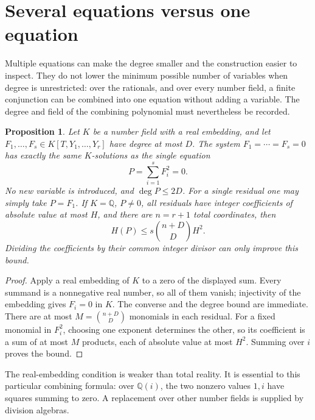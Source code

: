 \documentclass[11pt]{article}
\newtheorem{proposition}[theorem]{Proposition}
\theoremstyle{definition}
\begin{document}
\section{Several equations versus one equation}
\label{p3sys:combination}

Multiple equations can make the degree smaller and the construction
easier to inspect.  They do not lower the minimum possible number of
variables when degree is unrestricted: over the rationals, and over
every number field, a finite conjunction can be combined into one
equation without adding a variable.  The degree and field of the
combining polynomial must nevertheless be recorded.

\begin{proposition}\label{p3sys:sos-combination}
Let $K$ be a number field with a real embedding, and let
$F_1,\ldots,F_s\in K[T,Y_1,\ldots,Y_r]$ have degree at most $D$.
The system $F_1=\cdots=F_s=0$ has exactly the same $K$-solutions
as the single equation
\[
                         P=\sum_{i=1}^sF_i^2=0.
\]
No new variable is introduced, and $\deg P\le2D$.
For a single residual one may simply take $P=F_1$.
If $K=\mathbb Q$, $P\ne0$, all residuals have integer coefficients of
absolute value at most $H$, and there are $n=r+1$ total
coordinates, then
\[
               H(P)\le s\binom{n+D}{D}H^2.
\]
Dividing the coefficients by their common integer divisor can
only improve this bound.
\end{proposition}
\begin{proof}
Apply a real embedding of $K$ to a zero of the displayed sum.
Every summand is a nonnegative real number, so all of them vanish;
injectivity of the embedding gives $F_i=0$ in $K$.  The converse
and the degree bound are immediate.  There are at most
$M=\binom{n+D}{D}$ monomials in each residual.  For a fixed
monomial in $F_i^2$, choosing one exponent determines the other,
so its coefficient is a sum of at most $M$ products, each of
absolute value at most $H^2$.  Summing over $i$ proves the bound.
\end{proof}

The real-embedding condition is weaker than total reality.
It is essential to this particular combining formula: over
$\mathbb Q(i)$, the two nonzero values $1,i$ have squares summing
to zero.  A replacement over other number fields is supplied by
division algebras.
\end{document}
